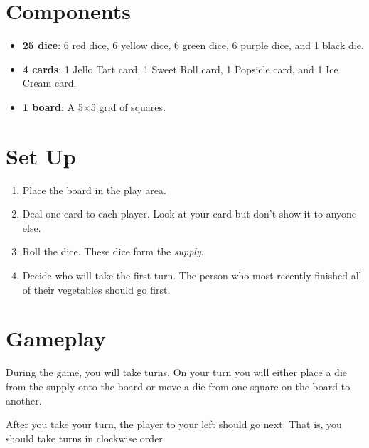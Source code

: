 \documentclass[a6paper, 11pt, parskip=half, DIV=15]{scrartcl}
\begin{document}
\section*{Components}
\begin{itemize}[leftmargin=*]
  \item \textbf{25 dice}: 6 red dice, 6 yellow dice, 6 green dice, 6 purple dice, and 1 black die.
  \item \textbf{4 cards}: 1 Jello Tart card, 1 Sweet Roll card, 1 Popsicle card, and 1 Ice Cream card.
  \item \textbf{1 board}: A 5$\times$5 grid of squares.
\end{itemize}

\section*{Set Up}
\begin{enumerate}[leftmargin=*]
  \item Place the board in the play area.
  \item Deal one card to each player. Look at your card but don't show it to anyone else.
  \item Roll the dice. These dice form the \emph{supply}.
  \item Decide who will take the first turn. The person who most recently finished all of their vegetables should go first. 
 \end{enumerate}
 
\newpage
\enlargethispage{1.75\baselineskip}
\section*{Gameplay}
During the game, you will take turns. On your turn you will either place a die from the supply onto the board or move a die from one square on the board to another.

After you take your turn, the player to your left should go next. That is, you should take turns in clockwise order.
\end{document}
